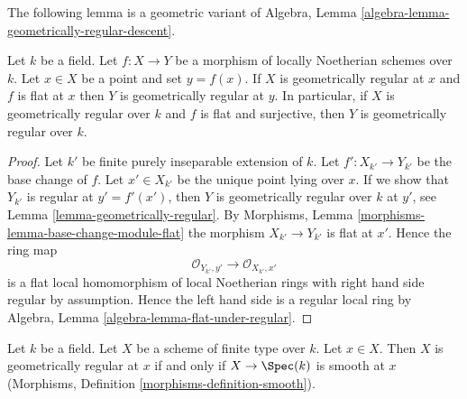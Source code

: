 \noindent
The following lemma is a geometric variant of
Algebra, Lemma \ref{algebra-lemma-geometrically-regular-descent}.

\begin{lemma}
\label{lemma-flat-under-geometrically-regular}
Let $k$ be a field.
Let $f : X \to Y$ be a morphism of locally Noetherian schemes over $k$.
Let $x \in X$ be a point and set $y = f(x)$.
If $X$ is geometrically regular at $x$ and
$f$ is flat at $x$ then $Y$ is geometrically regular at $y$.
In particular, if $X$ is geometrically regular over $k$ and
$f$ is flat and surjective, then $Y$ is geometrically regular over $k$.
\end{lemma}

\begin{proof}
Let $k'$ be finite purely inseparable extension of $k$.
Let $f' : X_{k'} \to Y_{k'}$ be the base change of $f$.
Let $x' \in X_{k'}$ be the unique point lying over $x$.
If we show that $Y_{k'}$ is regular at $y' = f'(x')$, then
$Y$ is geometrically regular over $k$ at $y'$, see
Lemma \ref{lemma-geometrically-regular}.
By
Morphisms, Lemma \ref{morphisms-lemma-base-change-module-flat}
the morphism $X_{k'} \to Y_{k'}$ is flat at $x'$.
Hence the ring map
$$
\mathcal{O}_{Y_{k'}, y'}
\longrightarrow
\mathcal{O}_{X_{k'}, x'}
$$
is a flat local homomorphism of local Noetherian rings with
right hand side regular by assumption. Hence the left hand side
is a regular local ring by
Algebra, Lemma \ref{algebra-lemma-flat-under-regular}.
\end{proof}

\begin{lemma}
\label{lemma-geometrically-regular-smooth}
Let $k$ be a field.
Let $X$ be a scheme of finite type over $k$.
Let $x \in X$.
Then $X$ is geometrically regular at $x$ if and only if $X \to \Spec(k)$
is smooth at $x$ (Morphisms, Definition \ref{morphisms-definition-smooth}).
\end{lemma}

